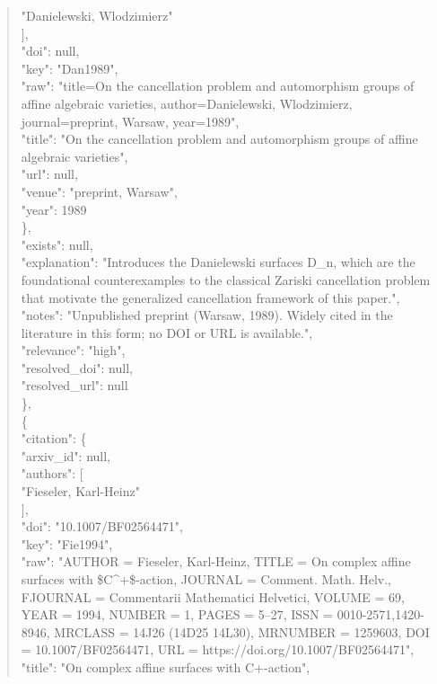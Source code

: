 \documentclass[11pt]{article}
\begin{document}
\begin{quote}
          "Danielewski, Wlodzimierz"\\
        ],\\
        "doi": null,\\
        "key": "Dan1989",\\
        "raw": "title=On the cancellation problem and automorphism groups of affine algebraic varieties, author=Danielewski, Wlodzimierz, journal=preprint, Warsaw, year=1989",\\
        "title": "On the cancellation problem and automorphism groups of affine algebraic varieties",\\
        "url": null,\\
        "venue": "preprint, Warsaw",\\
        "year": 1989\\
      \},\\
      "exists": null,\\
      "explanation": "Introduces the Danielewski surfaces D\_n, which are the foundational counterexamples to the classical Zariski cancellation problem that motivate the generalized cancellation framework of this paper.",\\
      "notes": "Unpublished preprint (Warsaw, 1989). Widely cited in the literature in this form; no DOI or URL is available.",\\
      "relevance": "high",\\
      "resolved\_doi": null,\\
      "resolved\_url": null\\
    \},\\
    \{\\
      "citation": \{\\
        "arxiv\_id": null,\\
        "authors": [\\
          "Fieseler, Karl-Heinz"\\
        ],\\
        "doi": "10.1007/BF02564471",\\
        "key": "Fie1994",\\
        "raw": "AUTHOR = Fieseler, Karl-Heinz, TITLE = On complex affine surfaces with \$C\^{}+\$-action, JOURNAL = Comment. Math. Helv., FJOURNAL = Commentarii Mathematici Helvetici, VOLUME = 69, YEAR = 1994, NUMBER = 1, PAGES = 5--27, ISSN = 0010-2571,1420-8946, MRCLASS = 14J26 (14D25 14L30), MRNUMBER = 1259603, DOI = 10.1007/BF02564471, URL = https://doi.org/10.1007/BF02564471",\\
        "title": "On complex affine surfaces with C+-action",\\

\end{quote}
\end{document}

